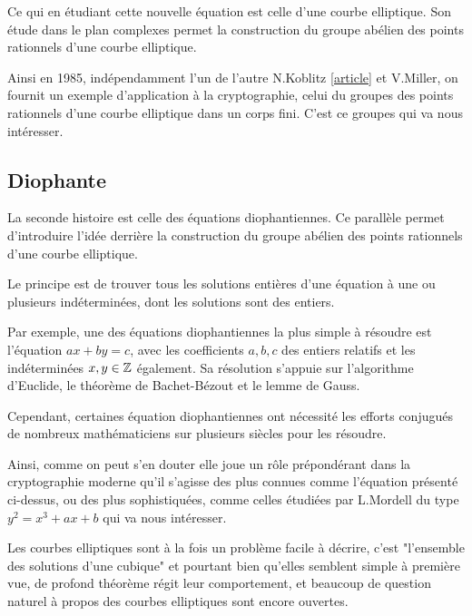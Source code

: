 Ce qui en étudiant cette nouvelle équation est celle d'une courbe elliptique. Son étude dans
le plan complexes permet la construction du groupe abélien des points rationnels d'une
courbe elliptique.

Ainsi en 1985, indépendamment l'un de l'autre N.Koblitz \ref{article} et V.Miller, on fournit un exemple
d'application à la cryptographie, celui du groupes des points rationnels d'une courbe elliptique dans un corps fini. C'est ce
groupes qui va nous intéresser.

\subsection{Diophante}

La seconde histoire est celle des équations diophantiennes. Ce parallèle permet d'introduire
l'idée derrière la construction du groupe abélien des points rationnels d'une courbe
elliptique.

Le principe est de trouver tous les solutions entières d'une équation à une ou
plusieurs indéterminées, dont les solutions sont des entiers.

Par exemple, une des équations diophantiennes la plus simple à résoudre est l'équation $ax+by =
c$, avec
les coefficients $a,b,c$ des entiers relatifs et les indéterminées $x,y \in \mathbb{Z}$ également. Sa résolution s'appuie
sur l'algorithme d'Euclide, le théorème de Bachet-Bézout et le lemme de Gauss.

Cependant, certaines équation diophantiennes ont nécessité les efforts conjugués de nombreux
mathématiciens sur plusieurs siècles pour les résoudre.

Ainsi, comme on peut s'en douter elle joue un rôle prépondérant dans la
cryptographie moderne qu'il s'agisse des plus connues comme l'équation présenté ci-dessus, ou
des plus sophistiquées, comme celles étudiées par L.Mordell du type $y^2 = x^3 + ax+b$ qui va
nous intéresser.


Les courbes elliptiques sont à la fois un problème facile à décrire, c'est "l'ensemble des
solutions d'une cubique" et pourtant bien qu'elles semblent simple à première vue, de profond théorème régit
leur comportement, et beaucoup de question naturel à propos des courbes elliptiques sont encore
ouvertes.

